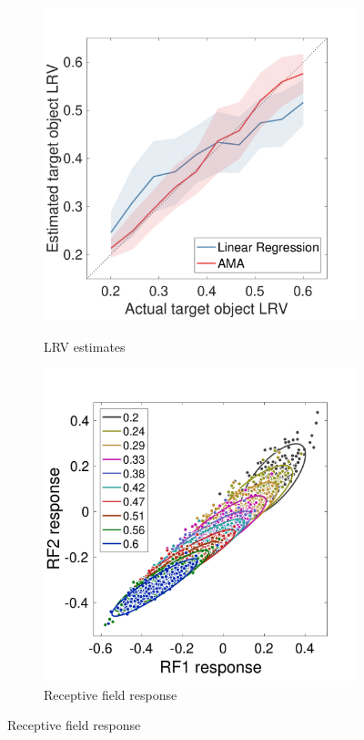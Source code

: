 \documentclass{jov}
\begin{document}
\begin{figure}
\centering
            \begin{subfigure}[b]{0.3 \textwidth}
        \caption{LRV estimates}
        \includegraphics[width=\textwidth, trim={0 0 0 1.3cm},clip]{../FiguresDraft5/Figure12/Figure12_a.pdf}
        \label{fig:case3Estimates}
    \end{subfigure} 
        \begin{subfigure}[b]{0.31\textwidth}
        \caption{Receptive field response}
        \includegraphics[width=\textwidth, trim={0 3mm 0 15mm},clip]{../FiguresDraft5/Figure12/Figure12_b.pdf}

\end{subfigure}
\end{figure}
\end{document}
